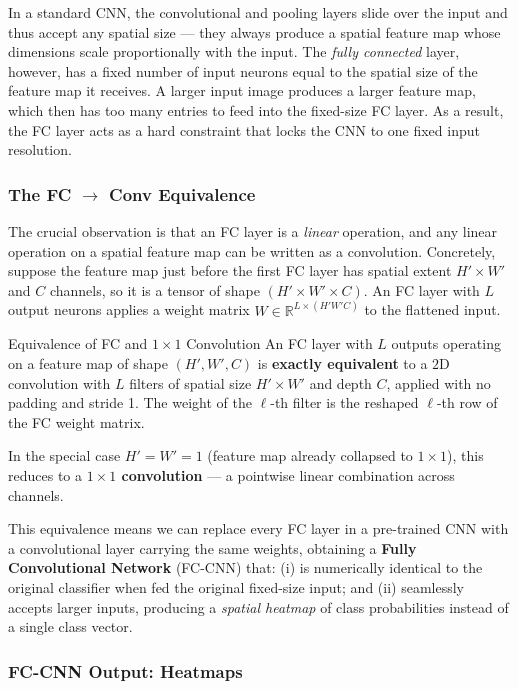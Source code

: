 \documentclass[11pt,a4paper]{article}
\newcommand{\term}[1]{\textcolor{DefGreen}{\textbf{#1}}\index{#1}}
\begin{document}
In a standard CNN, the convolutional and pooling layers slide over the input and thus accept any spatial size — they always produce a spatial feature map whose dimensions scale proportionally with the input. The \emph{fully connected} layer, however, has a fixed number of input neurons equal to the spatial size of the feature map it receives. A larger input image produces a larger feature map, which then has too many entries to feed into the fixed-size FC layer. As a result, the FC layer acts as a hard constraint that locks the CNN to one fixed input resolution.

\subsubsection{The FC $\to$ Conv Equivalence}

The crucial observation is that an FC layer is a \emph{linear} operation, and any linear operation on a spatial feature map can be written as a convolution. Concretely, suppose the feature map just before the first FC layer has spatial extent $H' \times W'$ and $C$ channels, so it is a tensor of shape $(H' \times W' \times C)$. An FC layer with $L$ output neurons applies a weight matrix $W \in \mathbb{R}^{L \times (H' W' C)}$ to the flattened input.

\begin{defbox}{Equivalence of FC and $1\times1$ Convolution}
An FC layer with $L$ outputs operating on a feature map of shape $(H', W', C)$ is \textbf{exactly equivalent} to a $2$D convolution with $L$ filters of spatial size $H' \times W'$ and depth $C$, applied with no padding and stride 1. The weight of the $\ell$-th filter is the reshaped $\ell$-th row of the FC weight matrix.

In the special case $H' = W' = 1$ (feature map already collapsed to $1\times 1$), this reduces to a \textbf{$1\times 1$ convolution} — a pointwise linear combination across channels.
\end{defbox}

This equivalence means we can replace every FC layer in a pre-trained CNN with a convolutional layer carrying the same weights, obtaining a \term{Fully Convolutional Network} (FC-CNN) that: (i) is numerically identical to the original classifier when fed the original fixed-size input; and (ii) seamlessly accepts larger inputs, producing a \emph{spatial heatmap} of class probabilities instead of a single class vector.

\subsubsection{FC-CNN Output: Heatmaps}
\end{document}
